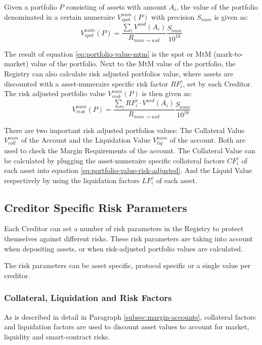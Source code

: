 \documentclass[sigconf,nonacm]{acmart}
\begin{document}
Given a portfolio $P$ consisting of assets with amount $A_{i}$, the value of the portfolio denominated in a certain numeraire $V_{spot}^{num}(P)$ with precision $S_{num}$ is given as:
\begin{equation}
    \label{eq:portfolio-value-mtm}
    V_{spot}^{num}(P) = \frac{\sum_{i}{V^{usd}(A_{i})}}{R_{num\rightarrow usd}}\frac{S_{num}}{10^{18}}
\end{equation}

The result of equation \ref{eq:portfolio-value-mtm} is the spot or MtM (mark-to-market) value of the portfolio.
Next to the MtM value of the portfolio, the Registry can also calculate risk adjusted portfolios value,
where assets are discounted with a asset-numeraire specific risk factor $RF_{i}^{c}$, set by each Creditor.
The risk adjusted portfolio value $V_{risk}^{num}(P)$ is then given as:
\begin{equation}
    \label{eq:portfolio-value-risk-adjusted}
    V_{risk}^{num}(P) = \frac{\sum_{i}{RF_{i}^{c} \cdot V^{usd}(A_{i})}}{R_{num\rightarrow usd}}\frac{S_{num}}{10^{18}}
\end{equation}

There are two important risk adjusted portfolios values: The Collateral Value $V_{coll}^{num}$ of the Account and the Liquidation Value $V_{liq}^{num}$ of the account.
Both are used to check the Margin Requirements of the account.
The Collateral Value can be calculated by plugging the asset-numeraire specific collateral factors $CF_{i}^{c}$ of each asset into equation \ref{eq:portfolio-value-risk-adjusted}.
And the Liquid Value respectively by using the liquidation factors $LF_{i}^{c}$ of each asset.

\subsection{Creditor Specific Risk Parameters}
\label{subsec:creditor-specific-cisk-parameters}
Each Creditor can set a number of risk parameters in the Registry to protect themselves against different risks.
These risk parameters are taking into account when depositing assets, or when risk-adjusted portfolio values are calculated.

The risk parameters can be asset specific, protocol specific or a single value per creditor.

\subsubsection{Collateral, Liquidation and Risk Factors}
As is described in detail in Paragraph \ref{subsec:margin-accounts}, collateral factors and liquidation factors are used to discount asset values to account for market, liquidity and smart-contract risks.
\end{document}

